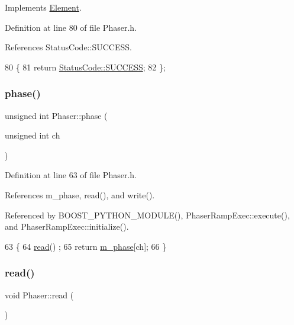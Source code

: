 Implements \hyperlink{classElement_af42754b5cabc198869222725218d695c}{Element}.



Definition at line 80 of file Phaser.\+h.



References Status\+Code\+::\+S\+U\+C\+C\+E\+SS.


\begin{DoxyCode}
80                     \{
81     \textcolor{keywordflow}{return} \hyperlink{classStatusCode_a6f565cbeadc76d14c72f047e5e85eb4badd0da38d3ba0d922efd1f4619bc37ad8}{StatusCode::SUCCESS};
82   \};
\end{DoxyCode}
\mbox{\label{classPhaser_a3928ba4f1421c83b2f7783da87727ff2}} 
\subsubsection{\texorpdfstring{phase()}{phase()}}
{\footnotesize\ttfamily unsigned int Phaser\+::phase (\begin{DoxyParamCaption}\item[{unsigned int}]{ch }\end{DoxyParamCaption})\hspace{0.3cm}{\ttfamily [inline]}}



Definition at line 63 of file Phaser.\+h.



References m\+\_\+phase, read(), and write().



Referenced by B\+O\+O\+S\+T\+\_\+\+P\+Y\+T\+H\+O\+N\+\_\+\+M\+O\+D\+U\+L\+E(), Phaser\+Ramp\+Exec\+::execute(), and Phaser\+Ramp\+Exec\+::initialize().


\begin{DoxyCode}
63                                      \{
64     \hyperlink{classPhaser_a6ce0713403e961495192ffa0590c29e4}{read}() ;
65     \textcolor{keywordflow}{return} \hyperlink{classPhaser_a04df9ce4afe7a36ccaba5e5e727d504e}{m\_phase}[ch];
66   \}
\end{DoxyCode}
\mbox{\label{classPhaser_a6ce0713403e961495192ffa0590c29e4}} 
\subsubsection{\texorpdfstring{read()}{read()}}
{\footnotesize\ttfamily void Phaser\+::read (\begin{DoxyParamCaption}{ }\end{DoxyParamCaption})}



